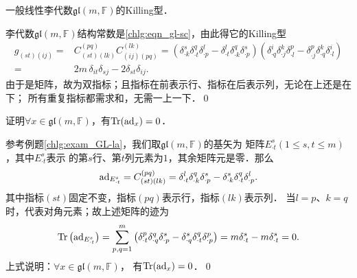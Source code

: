 \begin{example}
    一般线性李代数$\mathfrak{gl}(m,\mathbb{F})$的Killing型．
\end{example}
李代数$\mathfrak{gl}(m,\mathbb{F})$结构常数是\eqref{chlg:eqn_gl-sc}，由此得它的Killing型
\begin{equation}\label{chlg:eqn_KillingF-gl}
\begin{aligned}
    g_{(st)(ij)} =& C^{(pq)}_{(st)(lk)} C^{(lk)}_{(ij)(pq)}
    = \left(\delta^s_{\cdot k} \delta^q_{\cdot t} \delta^l_{\cdot p}
    -\delta^l_{\cdot t} \delta^q_{\cdot k} \delta^s_{\cdot p} \right)
    \left(\delta^i_{\cdot q} \delta^k_{\cdot j} \delta^p_{\cdot l}
    -\delta^p_{\cdot j} \delta^k_{\cdot q} \delta^i_{\cdot l} \right) \\
    =& 2m\, \delta_{it} \delta_{sj} - 2\delta_{st} \delta_{ij}.
\end{aligned}
\end{equation}
由于是矩阵，故为双指标；且指标在前表示行、指标在后表示列，无论在上还是在下；
所有重复指标都需求和，无需一上一下．\qed


\begin{example}\label{chlg:exm_Tr-gl}
    证明$\forall x\in \mathfrak{gl}(m,\mathbb{F})$，有${\rm Tr}({\rm ad}_{x})=0$．
\end{example}
参考例题\ref{chlg:exam_GL-la}，我们取$\mathfrak{gl}(m,\mathbb{F})$的基矢为
矩阵$E^s_{\cdot t}(1\leqslant s,t \leqslant m)$，其中$E^s_{\cdot t}$表示
的第$s$行、第$t$列元素为$1$，其余矩阵元是零．那么
\begin{align*}
    {\rm ad}_{E^s_{\cdot t}}=C^{(pq)}_{(st)(lk)} 
    = \delta^l_{\cdot t} \delta^q_{\cdot k} \delta^s_{\cdot p}
    -\delta^s_{\cdot k} \delta^q_{\cdot t} \delta^l_{\cdot p}.
\end{align*}
其中指标$(st)$固定不变，指标$(pq)$表示行，指标$(lk)$表示列．
当$l=p$、$k=q$时，代表对角元素；故上述矩阵的迹为
\begin{align*}
    {\rm Tr}\left( {\rm ad}_{E^s_{\cdot t}} \right)=
    \sum_{p,q=1}^{m}\left(\delta^p_{\cdot t} \delta^q_{\cdot q} \delta^s_{\cdot p}
    -\delta^s_{\cdot q} \delta^q_{\cdot t} \delta^p_{\cdot p} \right)
    = m \delta^s_{\cdot t}- m \delta^s_{\cdot t}=0.
\end{align*}    
上式说明：$\forall x\in \mathfrak{gl}(m,\mathbb{F})$，
有${\rm Tr}({\rm ad}_{x})=0$．\qed




